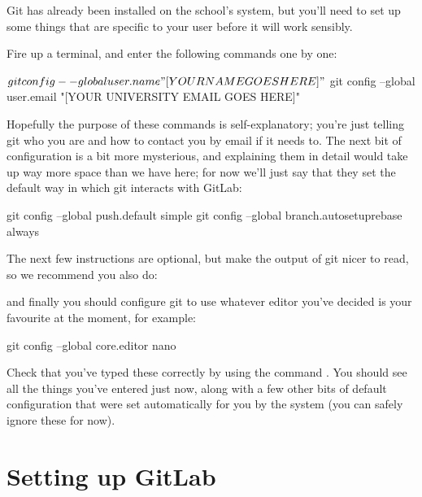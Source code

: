 Git has already been installed on the school's system, but you'll need to set up some things that are specific to your user before it will work sensibly. 

Fire up a terminal, and enter the following commands one by one:

\begin{ttoutenv}
$ git config --global user.name "[YOUR NAME GOES HERE]"
$ git config --global user.email "[YOUR UNIVERSITY EMAIL GOES HERE]" 
\end{ttoutenv}

Hopefully the purpose of these commands is self-explanatory; you're just telling git who you are and how to contact you by email if it needs to. The next bit of configuration is a bit more mysterious, and explaining them in detail would take up way more space than we have here; for now we'll just say that they set the default way in which git interacts with GitLab:

\begin{ttoutenv}
git config --global push.default simple
git config --global branch.autosetuprebase always 
\end{ttoutenv}

The next few instructions are optional, but make the output of git nicer to read, so we recommend you also do:


and finally you should configure git to use whatever editor you've decided is your favourite at the moment, for example:

\begin{ttoutenv}
git config --global core.editor nano 
\end{ttoutenv}

Check that you've typed these correctly by using the command . You should see all the things you've entered just now, along with a few other bits of default configuration that were set automatically for you by the system (you can safely ignore these for now).

\section{Setting up GitLab}

